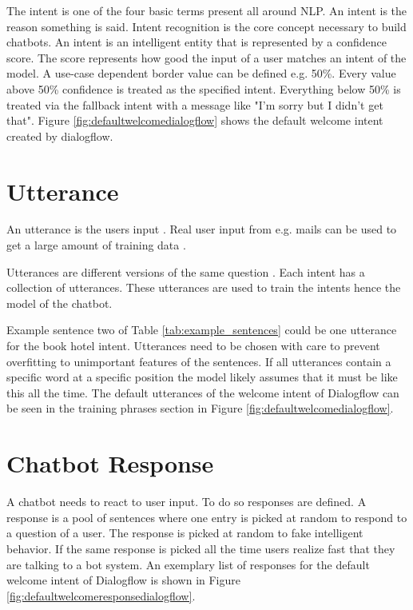 \documentclass[12pt, backref]{report}
\begin{document}
The intent is one of the four basic terms present all around NLP.
An intent is the reason something is said. Intent recognition is the core concept necessary to build chatbots.
An intent is an intelligent entity that is represented by a confidence score. 
The score represents how good the input of a user matches an intent of the model.
A use-case dependent border value can be defined e.g. 50\%. Every value above 50\% confidence is treated as the specified intent.
Everything below 50\% is treated via the fallback intent with a message like "I'm sorry but I didn't get that".
Figure \ref{fig:defaultwelcomedialogflow} shows the default welcome intent created by dialogflow. 

\section{Utterance}
An utterance is the users input \cite{singhbuilding, dutta2017developing}.
Real user input from e.g. mails can be used to get a large amount of training data \cite{singhbuilding}.	

Utterances are different versions of the same question \cite{buiildChatbotsPython}.
Each intent has a collection of utterances. These utterances are used to train the intents hence the model of the chatbot.

Example sentence two of Table \ref{tab:example_sentences} could be one utterance for the book hotel intent.
Utterances need to be chosen with care to prevent overfitting to unimportant features of the sentences.
If all utterances contain a specific word at a specific position the model likely assumes that it must be like this all the time.
The default utterances of the welcome intent of Dialogflow can be seen in the training phrases section in Figure \ref{fig:defaultwelcomedialogflow}.

\section{Chatbot Response}
A chatbot needs to react to user input. To do so responses are defined. A response is a pool of sentences where one entry is picked at random to respond to a question of a user. The response is picked at random to fake intelligent behavior. If the same response is picked all the time users realize fast that they are talking to a bot system. An exemplary list of responses for the default welcome intent of Dialogflow is shown in Figure \ref{fig:defaultwelcomeresponsedialogflow}.
\end{document}
